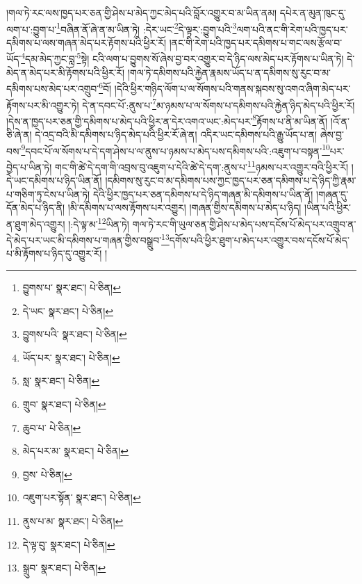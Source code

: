 །གལ་ཏེ་རང་ལས་ཁྱད་པར་ཅན་གྱི་ཤེས་པ་མེད་ཀྱང་མེད་པའི་བློར་འགྱུར་བ་མ་ཡིན་ནམ། དཔེར་ན་མུན་ཁུང་དུ་ལག་པ་:བྱུག་པ་\footnote{བྱུགས་པ་  སྣར་ཐང་།  པེ་ཅིན། }བཞིན་ནོ་ཞེ་ན་མ་ཡིན་ཏེ། :དེར་ཡང་\footnote{དེ་ཡང་  སྣར་ཐང་།  པེ་ཅིན། }དེ་ལྟར་:བྱུག་པའི་\footnote{བྱུགས་པའི་  སྣར་ཐང་།  པེ་ཅིན། }ལག་པའི་ནང་གི་རེག་པའི་ཁྱད་པར་དམིགས་པ་ལས་གཞན་མེད་པར་རྟོགས་པའི་ཕྱིར་རོ། །ནང་གི་རེག་པའི་ཁྱད་པར་དམིགས་པ་གང་ལས་རྩོལ་བ་ཡོད་\footnote{ཡོད་པར་  སྣར་ཐང་།  པེ་ཅིན། }དམ་མེད་ཀྱང་བླ་\footnote{སླ་  སྣར་ཐང་།  པེ་ཅིན། }སྟེ། ངའི་ལག་པ་བྱུགས་སོ་ཞེས་བྱ་བར་འགྱུར་བ་དེ་ཉིད་ལས་མེད་པར་རྟོགས་པ་ཡིན་ཏེ། དེ་མེད་ན་མེད་པར་མི་རྟོགས་པའི་ཕྱིར་རོ། །གལ་ཏེ་དམིགས་པའི་རྐྱེན་རྣམས་ཡོད་པ་ན་དམིགས་སུ་རུང་བ་མ་དམིགས་པས་མེད་པར་འགྲུབ་\footnote{གྲུབ་  སྣར་ཐང་།  པེ་ཅིན། }བོ། །དེའི་ཕྱིར་གཉིད་ལོག་པ་ལ་སོགས་པའི་གནས་སྐབས་སུ་འགའ་ཞིག་མེད་པར་རྟོགས་པར་མི་འགྱུར་ཏེ། དེ་ན་དབང་པོ་:ནུས་པ་\footnote{ཆུབ་པ་  པེ་ཅིན། }མ་ཉམས་པ་ལ་སོགས་པ་དམིགས་པའི་རྐྱེན་ཉིད་མེད་པའི་ཕྱིར་རོ། །དེས་ན་ཁྱད་པར་ཅན་གྱི་དམིགས་པ་མེད་པའི་ཕྱིར་ན་དེར་འགའ་ཡང་:མེད་པར་\footnote{མེད་པར་མ་  སྣར་ཐང་།  པེ་ཅིན། }རྟོགས་པ་ནི་མ་ཡིན་ནོ། །འོ་ན་ཅི་ཞེ་ན། དེ་འདྲ་བའི་མི་དམིགས་པ་ཉིད་མེད་པའི་ཕྱིར་རོ་ཞེ་ན། འདིར་ཡང་དམིགས་པའི་རྒྱུ་ཡོད་པ་ན། ཞེས་བྱ་བས་\footnote{བྱས་  པེ་ཅིན། }དབང་པོ་ལ་སོགས་པ་དེ་དག་ཤེས་པ་ལ་ནུས་པ་ཉམས་པ་མེད་པས་དམིགས་པའི་:འཇུག་པ་བསྟན་\footnote{འཇུག་པར་སྟོན་  སྣར་ཐང་།  པེ་ཅིན། }པར་བྱེད་པ་ཡིན་ཏེ། གང་གི་ཚེ་དེ་དག་གི་འབྲས་བུ་འཇུག་པ་དེའི་ཚེ་དེ་དག་:ནུས་པ་\footnote{ནུས་པ་མ་  སྣར་ཐང་།  པེ་ཅིན། }ཉམས་པར་འགྱུར་བའི་ཕྱིར་རོ། །དེ་ཡང་དམིགས་པ་ཉིད་ཡིན་ནོ། །དམིགས་སུ་རུང་བ་མ་དམིགས་པས་ཀྱང་ཁྱད་པར་ཅན་དམིགས་པ་དེ་ཉིད་ཀྱི་རྣམ་པ་གཅིག་ཏུ་ངེས་པ་ཡིན་ཏེ། དེའི་ཕྱིར་ཁྱད་པར་ཅན་དམིགས་པ་དེ་ཉིད་གཞན་མི་དམིགས་པ་ཡིན་ནོ། །གཞན་དུ་དོན་མེད་པ་ཉིད་ནི། །མི་དམིགས་པ་ལས་རྟོགས་པར་འགྱུར། །གཞན་གྱིས་དམིགས་པ་མེད་པ་ཉིད། །ཡིན་པའི་ཕྱིར་ན་ཐུག་མེད་འགྱུར། །:དེ་ལྟ་མ་\footnote{དེ་ལྟ་བུ་  སྣར་ཐང་།  པེ་ཅིན། }ཡིན་ཏེ། གལ་ཏེ་རང་གི་ཡུལ་ཅན་གྱི་ཤེས་པ་མེད་པས་དངོས་པོ་མེད་པར་འགྲུབ་ན་དེ་མེད་པར་ཡང་མི་དམིགས་པ་གཞན་གྱིས་བསྒྲུབ་\footnote{སྒྲུབ་  སྣར་ཐང་།  པེ་ཅིན། }དགོས་པའི་ཕྱིར་ཐུག་པ་མེད་པར་འགྱུར་བས་དངོས་པོ་མེད་པ་མི་རྟོགས་པ་ཉིད་དུ་འགྱུར་རོ། །
